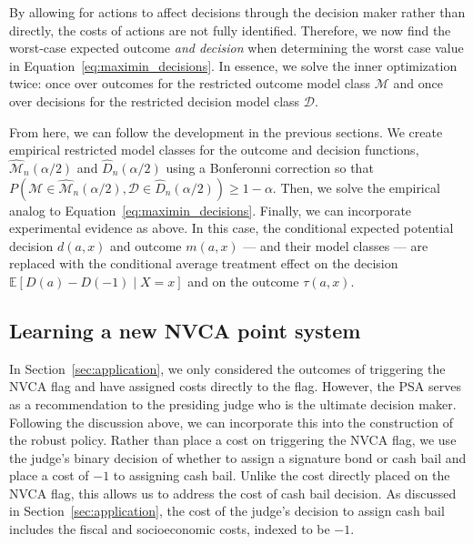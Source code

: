 \documentclass[12pt]{article}
\theoremstyle{definition}
\newcommand{\E}{\ensuremath{\mathbb{E}}}
\newcommand{\<}{\langle}
\renewcommand{\>}{\rangle}
\newcommand\mcal[1]{\ensuremath{\mathcal{#1}}}
\begin{document}
By allowing for actions to affect decisions through the decision maker
rather than directly, the costs of actions are not fully
identified. Therefore, we now find the worst-case expected outcome
\emph{and decision} when determining the worst case value in
Equation~\eqref{eq:maximin_decisions}. In essence, we solve the inner
optimization twice: once over outcomes for the restricted outcome
model class $\mcal{M}$ and once over decisions for the restricted
decision model class $\mcal{D}$.
  
From here, we can follow the development in the previous sections. We
create empirical restricted model classes for the outcome and decision
functions, $\widehat{\mcal{M}}_n(\alpha / 2)$ and
$\widehat{D}_n(\alpha / 2)$ using a Bonferonni correction so that
$P(\mcal{M} \in \widehat{\mcal{M}}_n(\alpha / 2), \mcal{D} \in
\widehat{D}_n(\alpha / 2)) \geq 1 - \alpha$. Then, we solve the
empirical analog to Equation~\eqref{eq:maximin_decisions}. Finally, we
can incorporate experimental evidence as above.  In this case, the
conditional expected potential decision $d(a,x)$ and outcome $m(a,x)$
--- and their model classes --- are replaced with the conditional
average treatment effect on the decision $\E[D(a) - D(-1) \mid X = x]$
and on the outcome $\tau(a,x)$.
  
  
\subsection{Learning a new NVCA point system}
  
In Section~\ref{sec:application}, we only considered the outcomes of
triggering the NVCA flag and have assigned costs directly to the
flag. However, the PSA serves as a recommendation to the presiding
judge who is the ultimate decision maker. Following the discussion
above, we can incorporate this into the construction of the robust
policy.  Rather than place a cost on triggering the NVCA flag, we use
the judge's binary decision of whether to assign a signature bond or
cash bail and place a cost of $-1$ to assigning cash bail. Unlike the
cost directly placed on the NVCA flag, this allows us to address the
cost of cash bail decision.  As discussed in
Section~\ref{sec:application}, the cost of the judge's decision to
assign cash bail includes the fiscal and socioeconomic costs, indexed
to be $-1$.
  
\end{document}
